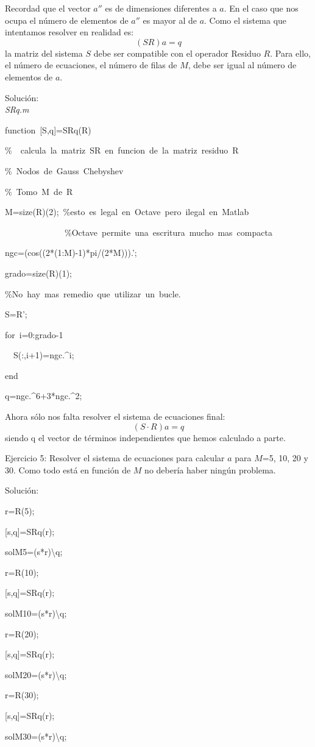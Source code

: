 Recordad que el vector $a''$ es de dimensiones diferentes a $a$.
En el caso que nos ocupa el número de elementos de $a''$ es mayor
al de $a$. Como el sistema que intentamos resolver en realidad es:\[
(SR)a=q\]
la matriz del sistema $S$ debe ser compatible con el operador Residuo
$R$. Para ello, el número de ecuaciones, el número de filas de $M$,
debe ser igual al número de elementos de $a$.

Solución:\\
\emph{SRq.m}

\begin{lyxcode}
function~{[}S,q]=SRq(R)

\%~~calcula~la~matriz~SR~en~funcion~de~la~matriz~residuo~R

\%~Nodos~de~Gauss~Chebyshev

\%~Tomo~M~de~R

M=size(R)(2);~\%esto~es~legal~en~Octave~pero~ilegal~en~Matlab

~~~~~~~~~~~~~~\%Octave~permite~una~escritura~mucho~mas~compacta

ngc=(cos((2{*}(1:M)-1){*}pi/(2{*}M))).';

grado=size(R)(1);

\%No~hay~mas~remedio~que~utilizar~un~bucle.

S=R';

for~i=0:grado-1

~~S(:,i+1)=ngc.\textasciicircum{}i;

end

q=ngc.\textasciicircum{}6+3{*}ngc.\textasciicircum{}2;
\end{lyxcode}
\lyxline{\normalsize}

Ahora sólo nos falta resolver el sistema de ecuaciones final:\[
(S\cdot R)a=q\]
siendo q el vector de términos independientes que hemos calculado
a parte.

\lyxline{\normalsize}

Ejercicio 5: Resolver el sistema de ecuaciones para calcular $a$
para $M$=5, 10, 20 y 30. Como todo está en función de $M$ no debería
haber ningún problema.

Solución:

\begin{lyxcode}
r=R(5);

{[}s,q]=SRq(r);

solM5=(s{*}r)\textbackslash{}q;



r=R(10);

{[}s,q]=SRq(r);

solM10=(s{*}r)\textbackslash{}q;



r=R(20);

{[}s,q]=SRq(r);

solM20=(s{*}r)\textbackslash{}q;



r=R(30);

{[}s,q]=SRq(r);

solM30=(s{*}r)\textbackslash{}q;
\end{lyxcode}
\lyxline{\normalsize}



